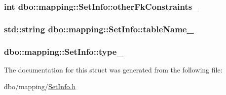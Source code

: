\hypertarget{structdbo_1_1mapping_1_1_set_info_a05c008084f20eb52f7f1145be419d2f1}{
\subsubsection[{other\+Fk\+Constraints\+\_\+}]{\setlength{\rightskip}{0pt plus 5cm}int dbo\+::mapping\+::\+Set\+Info\+::other\+Fk\+Constraints\+\_\+}}\label{structdbo_1_1mapping_1_1_set_info_a05c008084f20eb52f7f1145be419d2f1}
\hypertarget{structdbo_1_1mapping_1_1_set_info_a15381af2c3f8d8341b006633df78eade}{
\subsubsection[{table\+Name\+\_\+}]{\setlength{\rightskip}{0pt plus 5cm}std\+::string dbo\+::mapping\+::\+Set\+Info\+::table\+Name\+\_\+}}\label{structdbo_1_1mapping_1_1_set_info_a15381af2c3f8d8341b006633df78eade}
\hypertarget{structdbo_1_1mapping_1_1_set_info_a8e23d703a1fe265a10f4cdb335cb488e}{
\subsubsection[{type\+\_\+}]{ dbo\+::mapping\+::\+Set\+Info\+::type\+\_\+}}\label{structdbo_1_1mapping_1_1_set_info_a8e23d703a1fe265a10f4cdb335cb488e}


The documentation for this struct was generated from the following file\+:\begin{DoxyCompactItemize}
\item 
dbo/mapping/\hyperlink{_set_info_8h}{Set\+Info.\+h}\end{DoxyCompactItemize}
